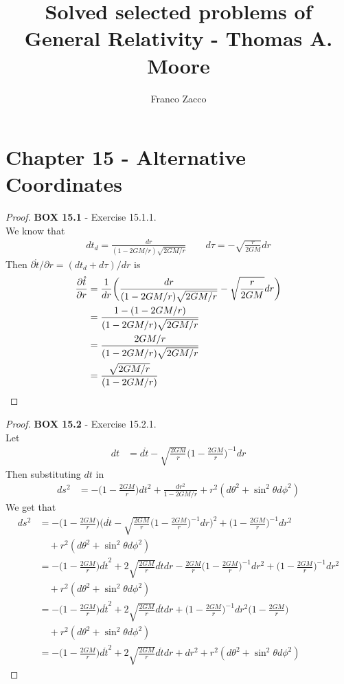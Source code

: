 \documentclass[11pt]{article}
\title{\textbf{Solved selected problems of General Relativity - Thomas A. Moore}}
\author{Franco Zacco}
\date{}
\theoremstyle{definition}
\begin{document}
\maketitle
\thispagestyle{empty}

\section*{Chapter 15 - Alternative Coordinates}

\begin{proof}{\textbf{BOX 15.1} - Exercise 15.1.1.}\\
We know that 
\begin{align*}
    dt_d = \frac{dr}{(1-2GM/r)\sqrt{2GM/r}} \qquad
    d\tau = -\sqrt{\frac{r}{2GM}}dr
\end{align*}
Then $\partial\mathring{t}/\partial r = (dt_d + d\tau)/dr$ is
\begin{align*}
    \pdv{\mathring{t}}{r}
    &= \frac{1}{dr}\bigg(
        \frac{dr}{(1-2GM/r)\sqrt{2GM/r}} - \sqrt{\frac{r}{2GM}}dr
    \bigg)\\
    &= \frac{1 - (1-2GM/r)}{(1-2GM/r)\sqrt{2GM/r}}\\
    &= \frac{2GM/r}{(1-2GM/r)\sqrt{2GM/r}}\\
    &= \frac{\sqrt{2GM/r}}{(1-2GM/r)}
\end{align*}
\end{proof}

\cleardoublepage
\begin{proof}{\textbf{BOX 15.2} - Exercise 15.2.1.}\\
Let
\begin{align*}
    dt &= d\mathring{t} - \sqrt{\frac{2GM}{r}}\bigg(1 - \frac{2GM}{r}\bigg)^{-1}dr
\end{align*}
Then substituting $dt$ in
\begin{align*}
    ds^2 &= -\bigg(1 - \frac{2GM}{r}\bigg)dt^2 + \frac{dr^2}{1 - 2GM/r}
    + r^2(d\theta^2 + \sin^2\theta d\phi^2)
\end{align*}
We get that
\begin{align*}
    ds^2
    &= -\bigg(1 - \frac{2GM}{r}\bigg)\bigg(
        d\mathring{t} - \sqrt{\frac{2GM}{r}}\bigg(1 - \frac{2GM}{r}\bigg)^{-1}dr
    \bigg)^2
    + \bigg(1 - \frac{2GM}{r}\bigg)^{-1}dr^2\\
    &\quad+ r^2(d\theta^2 + \sin^2\theta d\phi^2)\\
    &= -\bigg(1 - \frac{2GM}{r}\bigg)d\mathring{t}^2
    + 2\sqrt{\frac{2GM}{r}}d\mathring{t}dr
    - \frac{2GM}{r}\bigg(1 - \frac{2GM}{r}\bigg)^{-1}dr^2
    + \bigg(1 - \frac{2GM}{r}\bigg)^{-1}dr^2\\
    &\quad+ r^2(d\theta^2 + \sin^2\theta d\phi^2)\\
    &= -\bigg(1 - \frac{2GM}{r}\bigg)d\mathring{t}^2
    + 2\sqrt{\frac{2GM}{r}}d\mathring{t}dr
    + \bigg(1 - \frac{2GM}{r}\bigg)^{-1}dr^2\bigg(1 - \frac{2GM}{r}\bigg)\\
    &\quad+ r^2(d\theta^2 + \sin^2\theta d\phi^2)\\
    &= -\bigg(1 - \frac{2GM}{r}\bigg)d\mathring{t}^2
    + 2\sqrt{\frac{2GM}{r}}d\mathring{t}dr + dr^2
    + r^2(d\theta^2 + \sin^2\theta d\phi^2)
\end{align*}
\end{proof}
\end{document}
